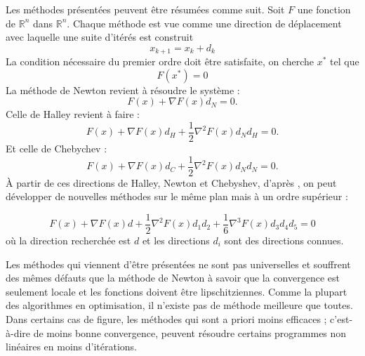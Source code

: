 Les m\'ethodes pr\'esent\'ees peuvent être r\'esum\'ees comme suit. Soit $F$ une fonction de $\mathbb{R}^n$
dans $\mathbb{R}^n$. Chaque m\'ethode est vue comme une direction de d\'eplacement avec laquelle une
suite d'it\'er\'es est construit \[x_{k+1}=x_k+d_k\]
La condition n\'ecessaire du premier ordre doit être satisfaite, on cherche $x^*$ tel que
\[F(x^*)=0\]
La m\'ethode de Newton revient \`a r\'esoudre le syst\`eme :
\[F(x)+\nabla F(x)d_N=0.\]
Celle de Halley revient \`a faire :
\[F(x)+\nabla F(x) d_H+\frac{1}{2} \nabla^2 F(x)d_N d_H=0.\]
Et celle de Chebychev :
\[F(x)+\nabla F(x) d_C+\frac{1}{2}\nabla^2 F(x)d_Nd_N=0.\]
%
%
\`A partir de ces directions de Halley, Newton et Chebyshev, d'apr\`es \cite{Kchouk}, on peut d\'evelopper de nouvelles m\'ethodes sur le même plan
mais \`a un ordre sup\'erieur :

\begin{equation}
 F(x)+\nabla F(x)d+\frac{1}{2}\nabla^2 F(x){
d_1d_2}+\frac{1}{6}\nabla^3 F(x){
 d_3d_4d_5}=0
\label{eq:extra}
\end{equation}
o\`u la direction recherch\'ee est $d$ et les directions $d_i$ sont des directions connues.









Les m\'ethodes qui viennent d'être pr\'esent\'ees ne sont pas universelles et souffrent des
mêmes d\'efauts que la m\'ethode de Newton \`a savoir que la convergence est seulement locale et les fonctions
doivent être lipschitziennes. Comme la plupart des algorithmes en optimisation, il
n'existe pas de m\'ethode meilleure que toutes. Dans certains cas de figure, les m\'ethodes qui sont a priori
moins efficaces ; c'est-\`a-dire de moins bonne convergence, peuvent r\'esoudre certains programmes non lin\'eaires en moins d'it\'erations.


